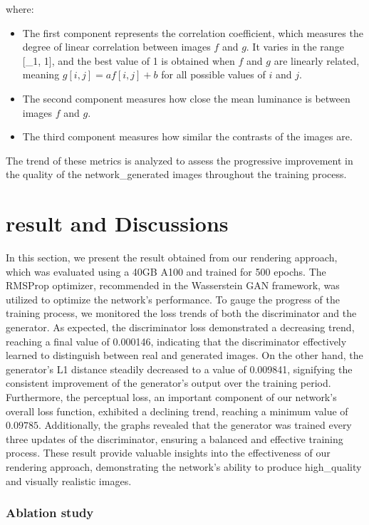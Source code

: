 where:
\begin{itemize}
    \item The first component represents the correlation coefficient, which measures the degree of linear correlation between images $f$ and $g$. It varies in the range [_1, 1], and the best value of 1 is obtained when $f$ and $g$ are linearly related, meaning $g[i,j] = af[i,j] + b$ for all possible values of $i$ and $j$.
    \item The second component measures how close the mean luminance is between images $f$ and $g$.
    \item The third component measures how similar the contrasts of the images are.
\end{itemize}

The trend of these metrics is analyzed to assess the progressive improvement in the quality of the network_generated images throughout the training process.

\section{result and Discussions}
\label{sec:rendering_result}
In this section, we present the result obtained from our rendering approach, which was evaluated using a 40GB A100 and trained for 500 epochs. The RMSProp optimizer, recommended in the Wasserstein GAN framework, was utilized to optimize the network's performance. To gauge the progress of the training process, we monitored the loss trends of both the discriminator and the generator. As expected, the discriminator loss demonstrated a decreasing trend, reaching a final value of 0.000146, indicating that the discriminator effectively learned to distinguish between real and generated images. On the other hand, the generator's L1 distance steadily decreased to a value of 0.009841, signifying the consistent improvement of the generator's output over the training period. Furthermore, the perceptual loss, an important component of our network's overall loss function, exhibited a declining trend, reaching a minimum value of $0.09785$. Additionally, the graphs revealed that the generator was trained every three updates of the discriminator, ensuring a balanced and effective training process. These result provide valuable insights into the effectiveness of our rendering approach, demonstrating the network's ability to produce high_quality and visually realistic images. 

\subsubsection{Ablation study}

